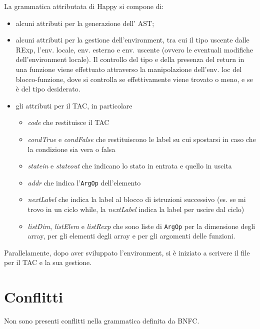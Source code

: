 \documentclass{article}
\begin{document}
La grammatica attributata di Happy si compone di:
\begin{itemize}
	\item alcuni attributi per la generazione dell' AST;
	\item alcuni attributi per la gestione dell'environment, tra cui il tipo uscente dalle RExp, l'env.
		locale, env. esterno e env. uscente (ovvero le eventuali modifiche dell'environment locale). Il
		controllo del tipo e della presenza del return in una funzione viene effettuato attraverso la manipolazione
		dell'env. loc del blocco-funzione, dove si controlla se effettivamente viene trovato o meno, e se è del tipo 
		desiderato.
	\item gli attributi per il TAC, in particolare 
	\begin{itemize}
	    \item \textit{code} che restituisce il TAC 
	    \item \textit{condTrue} e \textit{condFalse} che restituiscono le label su cui spostarsi in caso che la condizione sia vera o falsa
	    \item \textit{statein} e \textit{stateout} che indicano lo stato in entrata e quello in uscita 
	    \item \textit{addr} che indica l'\texttt{ArgOp} dell'elemento
	    \item \textit{nextLabel} che indica la label al blocco di istruzioni successivo (es. se mi trovo in un ciclo while, la \textit{nextLabel} indica la label per uscire dal ciclo)
	    \item \textit{listDim}, \textit{listElem} e \textit{listRexp} che sono liste di \texttt{ArgOp} per la dimensione degli array, per gli elementi degli array e per gli argomenti delle funzioni.
	\end{itemize}
	
\end{itemize}

Parallelamente, dopo aver sviluppato l'environment, si è iniziato a scrivere il file per il TAC e la sua 
gestione.

\section{Conflitti}
Non sono presenti conflitti nella grammatica definita da BNFC.
\end{document}
